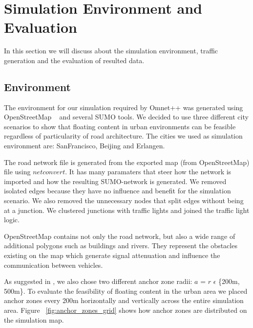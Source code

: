 
\chapter{Simulation Environment and Evaluation}

In this section we will discuss about the simulation environment, traffic
generation and the evaluation of resulted data.

\section{Environment}

The environment for our simulation required by Omnet++ was generated using
OpenStreetMap ~\cite{openstreetmap} and several SUMO tools. We decided to use
three different city scenarios to show that floating content in urban
environments can be feasible regardless of particularity of road
architecture. The cities we used as simulation environment are: SanFrancisco,
Beijing and Erlangen.

The road network file is generated from the exported map (from OpenStreetMap)
file using $netconvert$. It has many paramaters that steer how the network is
imported and how the resulting SUMO-network is generated. We removed
isolated edges because they have no influence and benefit for the simulation
scenario. We also removed the unnecessary nodes that split edges without being
at a junction. We clustered junctions with traffic lights and joined the traffic
light logic.

OpenStreetMap contains not only the road network, but also a wide range of
additional polygons such as buildings and rivers. They represent the obstacles
existing on the map which generate signal attenuation and influence the
communication between vehicles.

As suggested in \cite{percomfloatingcontent}, we also chose two different anchor
zone radii: $a$ = $r$ $\epsilon$ \{200m, 500m\}. To evaluate the feasibility of
floating content in the urban area we placed anchor zones every 200m
horizontally and vertically across the entire simulation area. Figure
~\ref{fig:anchor_zones_grid} shows how anchor zones are distributed on the
simulation map.

